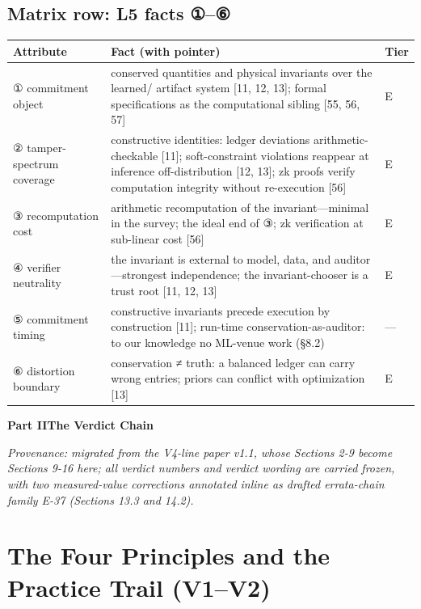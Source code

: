 \documentclass[11pt]{article}
\newcommand{\paperpart}[2]{\par\addvspace{2.4em}\begin{center}{\Large\bfseries Part #1\quad\textperiodcentered\quad #2}\end{center}\addvspace{0.4em}}
\begin{document}
\subsection{Matrix row: L5 facts ①–⑥}
\begingroup\footnotesize
\noindent\begin{tabularx}{\textwidth}{@{}>{\raggedright\arraybackslash}p{} >{\raggedright\arraybackslash}X >{\raggedright\arraybackslash}p{}@{}}
\toprule
\textbf{\textbf{Attribute}} & \textbf{\textbf{Fact (with pointer)}} & \textbf{\textbf{Tier}} \\
\midrule
① commitment object & conserved quantities and physical invariants over the learned/ artifact system [11, 12, 13]; formal specifications as the computational sibling [55, 56, 57] & E \\
② tamper-spectrum coverage & constructive identities: ledger deviations arithmetic-checkable [11]; soft-constraint violations reappear at inference off-distribution [12, 13]; zk proofs verify computation integrity without re-execution [56] & E \\
③ recomputation cost & arithmetic recomputation of the invariant—minimal in the survey; the ideal end of ③; zk verification at sub-linear cost [56] & E \\
④ verifier neutrality & the invariant is external to model, data, and auditor—strongest independence; the invariant-chooser is a trust root [11, 12, 13] & E \\
⑤ commitment timing & constructive invariants precede execution by construction [11]; run-time conservation-as-auditor: to our knowledge no ML-venue work (§8.2) & — \\
⑥ distortion boundary & conservation ≠ truth: a balanced ledger can carry wrong entries; priors can conflict with optimization [13] & E \\
\bottomrule
\end{tabularx}
\endgroup
\paperpart{II}{The Verdict Chain}
\noindent\emph{Provenance: migrated from the V4-line paper v1.1, whose Sections 2-9 become Sections 9-16 here; all verdict numbers and verdict wording are carried frozen, with two measured-value corrections annotated inline as drafted errata-chain family E-37 (Sections 13.3 and 14.2).}\par
\section{The Four Principles and the Practice Trail (V1–V2)}
\label{sec:9}
\end{document}
